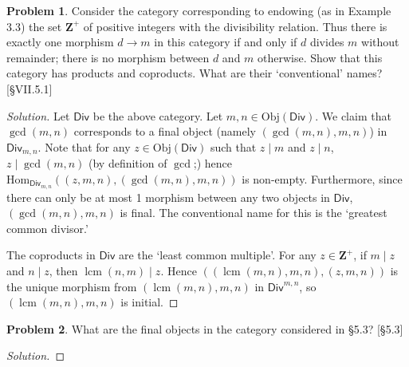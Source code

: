 \documentclass[fontsize=14pt]{scrartcl}
\DeclareMathOperator{\lcm}{lcm}
\theoremstyle{definition}
\newtheorem{problem-internal}{Problem}[subsection]
\newenvironment{problem}{
  \medskip
  \begin{problem-internal}
}{
  \end{problem-internal}
}
\newenvironment{solution}{
  \begin{proof}[Solution]
  \vspace{-8px}
  \setlength{\parskip}{4px}
  \setlength{\parindent}{0px}
}{
  \end{proof}
}
\newcommand{\Obj}{\mathrm{Obj}}
\newcommand{\Hom}{\mathrm{Hom}}
\begin{document}
\begin{problem}
Consider the category corresponding to endowing (as in Example 3.3) the set
$\mathbf{Z}^+$ of positive integers with the divisibility relation. Thus there
is exactly one morphism $d\to m$ in this category if and only if $d$ divides $m$
without remainder; there is no morphism between $d$ and $m$ otherwise. Show that
this category has products and coproducts. What are their `conventional' names?
[\S VII.5.1]
\end{problem}
\begin{solution}
\def \Div {\mathsf{Div}}
Let $\Div$ be the above category. Let $m,n\in\Obj(\Div)$. We claim that
$\gcd(m,n)$ corresponds to a final object (namely $(\gcd(m,n),m,n)$) in
$\Div_{m,n}$. Note that for any $z\in\Obj(\Div)$ such that $z\mid m$ and $z\mid
n$, $z\mid\gcd(m,n)$ (by definition of $\gcd$;) hence
$\Hom_{\Div_{m,n}}((z,m,n),(\gcd(m,n),m,n))$ is non-empty. Furthermore, since
there can only be at most 1 morphism between any two objects in $\Div$,
$(\gcd(m,n),m,n)$ is final. The conventional name for this is the `greatest
common divisor.'

The coproducts in $\Div$ are the `least common multiple'. For any
$z\in\mathbf{Z}^+$, if $m\mid z$ and $n\mid z$, then $\lcm(n,m)\mid z$. Hence
$((\lcm(m,n),m,n),(z,m,n))$ is the unique morphism from $(\lcm(m,n),m,n)$ in
$\Div^{m,n}$, so $(\lcm(m,n),m,n)$ is initial.
\end{solution}


\begin{problem}
What are the final objects in the category considered in \S5.3? [\S5.3]
\end{problem}
\begin{solution}
\end{solution}
\end{document}
